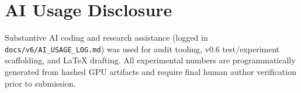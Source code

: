 \documentclass[11pt]{article}
\begin{document}
\section*{AI Usage Disclosure}
Substantive AI coding and research assistance (logged in \texttt{docs/v6/AI\_USAGE\_LOG.md}) was used for audit tooling, v0.6 test/experiment scaffolding, and LaTeX drafting. All experimental numbers are programmatically generated from hashed GPU artifacts and require final human author verification prior to submission.



\end{document}
